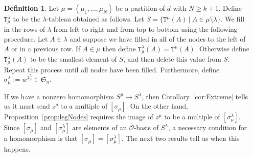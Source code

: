 \documentclass[twoside,11pt,reqno,letter]{amsart}
\numberwithin{equation}{section}
\newtheorem{Corollary}[equation]{Corollary}
\theoremstyle{definition}  %
\newtheorem{Definition}[equation]{Definition}
\newcommand{\0}{{\bar 0}}
\newcommand{\1}{{\bar 1}}
\newcommand{\la}{\lambda}
\def\Si{\mathfrak{S}}
\newcommand{\si}{\sigma}
\def\T{{\mathtt T}}
\renewcommand\O{\mathcal O}
\begin{document}
{\begin{Definition}
  Let $\mu = (\mu_1, \dots, \mu_N)$ be a partition of $d$ with $N \geq k+1$. Define $\T^\la_\mu$ to be the $\la$-tableau obtained as follows. Let $S = \{\T^\mu(A)\ |\ A \in \mu \setminus \la\}$. We fill in the rows of $\la$ from left to right and from top to bottom using the following procedure. Let $A \in \la$ and suppose we have filled in all of the nodes to the left of $A$ or in a previous row. If $A \in \mu$ then define $\T^\la_\mu(A) = \T^\mu(A)$. Otherwise define $\T^\la_\mu(A)$ to be the smallest element of $S$, and then delete this value from $S$. Repeat this process until all nodes have been filled. %
  Furthermore, define $\si^\la_\mu := w^{\T^\la_\mu} \in \Si_n$.
\end{Definition}

























If we have a nonzero homomorphism $S^\mu \to S^\la$, then Corollary~\ref{cor:Extreme} tells us it must send $z^\mu$ to a multiple of $[\si_{\mu}]$. On the other hand, Proposition~\ref{prop:legNodes} requires the image of $z^\mu$ to be a multiple of $[\si^\la_\mu]$. Since $[\si_{\mu}]$ and $[\si^\la_\mu]$ are elements of an $\O$-basis of $S^\la$, a necessary condition for a homomorphism is that $[\si_{\mu}] = [\si^\la_\mu]$. The next two results tell us when this happens.
















}
\end{document}
